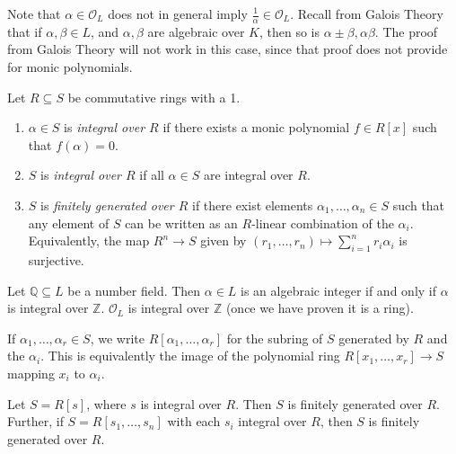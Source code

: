 Note that \( \alpha \in \mathcal O_L \) does not in general imply \( \frac{1}{\alpha} \in \mathcal O_L \).
Recall from Galois Theory that if \( \alpha, \beta \in L \), and \( \alpha, \beta \) are algebraic over \( K \), then so is \( \alpha \pm \beta, \alpha \beta \).
The proof from Galois Theory will not work in this case, since that proof does not provide for monic polynomials.
\begin{definition}
    Let \( R \subseteq S \) be commutative rings with a 1.
    \begin{enumerate}
        \item \( \alpha \in S \) is \emph{integral over \( R \)} if there exists a monic polynomial \( f \in R[x] \) such that \( f(\alpha) = 0 \).
        \item \( S \) is \emph{integral over \( R \)} if all \( \alpha \in S \) are integral over \( R \).
        \item \( S \) is \emph{finitely generated over \( R \)} if there exist elements \( \alpha_1, \dots, \alpha_n \in S \) such that any element of \( S \) can be written as an \( R \)-linear combination of the \( \alpha_i \).
        Equivalently, the map \( R^n \to S \) given by \( (r_1, \dots, r_n) \mapsto \sum_{i=1}^n r_i \alpha_i \) is surjective.
    \end{enumerate}
\end{definition}
\begin{example}
    Let \( \mathbb Q \subseteq L \) be a number field.
    Then \( \alpha \in L \) is an algebraic integer if and only if \( \alpha \) is integral over \( \mathbb Z \).
    \( \mathcal O_L \) is integral over \( \mathbb Z \) (once we have proven it is a ring).
\end{example}
If \( \alpha_1, \dots, \alpha_r \in S \), we write \( R[\alpha_1, \dots, \alpha_r] \) for the subring of \( S \) generated by \( R \) and the \( \alpha_i \).
This is equivalently the image of the polynomial ring \( R[x_1, \dots, x_r] \to S \) mapping \( x_i \) to \( \alpha_i \).
\begin{proposition}
    Let \( S = R[s] \), where \( s \) is integral over \( R \).
    Then \( S \) is finitely generated over \( R \).
    Further, if \( S = R[s_1, \dots, s_n] \) with each \( s_i \) integral over \( R \), then \( S \) is finitely generated over \( R \).
\end{proposition}

